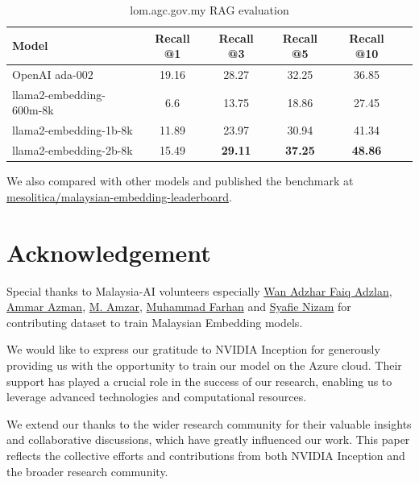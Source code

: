 \documentclass[preprint]{article}
\begin{document}
\begin{table}[hbt!]
  \centering
  \begin{tabular}{lccccl}
    \hline
    \textbf{Model}           & \textbf{Recall @1} & \textbf{Recall @3} & \textbf{Recall @5} & \textbf{Recall @10} \\
    \hline
    OpenAI ada-002           & 19.16              & 28.27              & 32.25              & 36.85               \\
    llama2-embedding-600m-8k & 6.6                & 13.75              & 18.86              & 27.45               \\
    llama2-embedding-1b-8k   & 11.89              & 23.97              & 30.94              & 41.34               \\
    llama2-embedding-2b-8k   & 15.49              & \textbf{29.11}     & \textbf{37.25}     & \textbf{48.86}      \\
    \hline
  \end{tabular}
  \caption{lom.agc.gov.my RAG evaluation}
\end{table}

\pagebreak

We also compared with other models and published the benchmark at \href{https://huggingface.co/spaces/mesolitica/malaysian-embedding-leaderboard}{mesolitica/malaysian-embedding-leaderboard}.

\section{Acknowledgement}

Special thanks to Malaysia-AI volunteers especially \href{https://www.linkedin.com/in/wan-adzhar-faiq-adzlan-19a27baa/}{Wan Adzhar Faiq Adzlan}, \href{https://www.linkedin.com/in/ammar-azman/}{Ammar Azman}, \href{https://www.linkedin.com/in/amzar96/}{M. Amzar}, \href{https://www.linkedin.com/in/muhammad-farhan-helmy-0529501a7/}{Muhammad Farhan} and \href{https://www.linkedin.com/in/syafie-nizam/}{Syafie Nizam} for contributing dataset to train Malaysian Embedding models.

We would like to express our gratitude to NVIDIA Inception for generously providing us with the opportunity to train our model on the Azure cloud. Their support has played a crucial role in the success of our research, enabling us to leverage advanced technologies and computational resources.

We extend our thanks to the wider research community for their valuable insights and collaborative discussions, which have greatly influenced our work. This paper reflects the collective efforts and contributions from both NVIDIA Inception and the broader research community.
\end{document}
